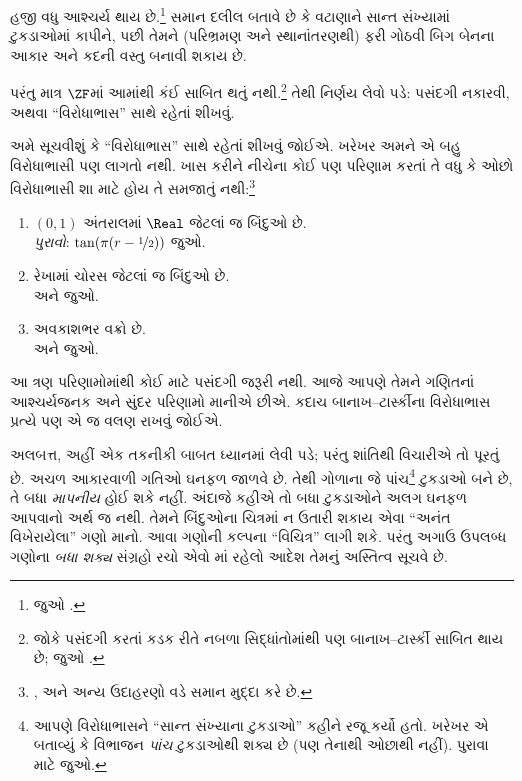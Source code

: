 હજી વધુ આશ્ચર્ય થાય છે.\footnote{જુઓ
\citet[Theorem 3.12]{Wagon2016}.}
સમાન દલીલ બતાવે છે કે વટાણાને
સાન્ત સંખ્યામાં ટુકડાઓમાં કાપીને,
પછી તેમને (પરિભ્રમણ અને સ્થાનાંતરણથી)
ફરી ગોઠવી બિગ બેનના આકાર અને
કદની વસ્તુ બનાવી શકાય છે.

પરંતુ માત્ર $\ZF$માં આમાંથી
કંઈ સાબિત થતું નથી.\footnote{જોકે
પસંદગી કરતાં કડક રીતે નબળા
સિદ્ધાંતોમાંથી પણ બાનાખ--ટાર્સ્કી
સાબિત થાય છે; જુઓ
\citet[303]{Wagon2016}.}
તેથી નિર્ણય લેવો પડે: પસંદગી નકારવી,
અથવા ``વિરોધાભાસ'' સાથે રહેતાં
શીખવું.

અમે સૂચવીશું કે ``વિરોધાભાસ''
સાથે રહેતાં શીખવું જોઈએ. ખરેખર
અમને એ બહુ વિરોધાભાસી પણ લાગતો
નથી. ખાસ કરીને નીચેના કોઈ પણ
પરિણામ કરતાં તે વધુ કે ઓછો
વિરોધાભાસી શા માટે હોય તે સમજાતું
નથી:\footnote{\citet[276--7]{Potter2004},
\citet[16]{Weston2003} અને
\citet[31, 308--9]{Wagon2016}
અન્ય ઉદાહરણો વડે સમાન મુદ્દા કરે છે.}
\begin{enumerate}
	\item $(0,1)$ અંતરાલમાં $\Real$ જેટલાં જ બિંદુઓ છે.
	\\\emph{પુરાવો}: $\tan(\pi(r-\nicefrac{1}{2}))$ જુઓ.
	\item રેખામાં ચોરસ જેટલાં જ બિંદુઓ છે.
	\\ અને
	 જુઓ.
	\item અવકાશભર વક્રો છે.
	\\ અને
	 જુઓ.
\end{enumerate}
આ ત્રણ પરિણામોમાંથી કોઈ માટે
પસંદગી જરૂરી નથી. આજે આપણે
તેમને ગણિતનાં આશ્ચર્યજનક અને
સુંદર પરિણામો માનીએ છીએ.
કદાચ બાનાખ--ટાર્સ્કીના વિરોધાભાસ
પ્રત્યે પણ એ જ વલણ રાખવું જોઈએ.

અલબત્ત, અહીં એક તકનીકી બાબત
ધ્યાનમાં લેવી પડે; પરંતુ શાંતિથી
વિચારીએ તો પૂરતું છે. અચળ આકારવાળી
ગતિઓ ઘનફળ જાળવે છે. તેથી ગોળાના
જે પાંચ\footnote{આપણે વિરોધાભાસને
``સાન્ત સંખ્યાના ટુકડાઓ'' કહીને
રજૂ કર્યો હતો. ખરેખર
\citet{Robinson1947}એ બતાવ્યું
કે વિભાજન \emph{પાંચ} ટુકડાઓથી
શક્ય છે (પણ તેનાથી ઓછાથી નહીં).
પુરાવા માટે \citet[pp.~66--7]{Wagon2016}
જુઓ.} ટુકડાઓ બને છે, તે બધા
\emph{માપનીય} હોઈ શકે નહીં.
અંદાજે કહીએ તો બધા ટુકડાઓને અલગ
ઘનફળ આપવાનો અર્થ જ નથી. તેમને
બિંદુઓના ચિત્રમાં ન ઉતારી શકાય
એવા ``અનંત વિખેરાયેલા'' ગણો માનો.
આવા ગણોની કલ્પના ``વિચિત્ર'' લાગી
શકે. પરંતુ અગાઉ ઉપલબ્ધ ગણોના
\emph{બધા શક્ય} સંગ્રહો રચો એવો
\stagesacc{}માં રહેલો આદેશ તેમનું
અસ્તિત્વ સૂચવે છે.

